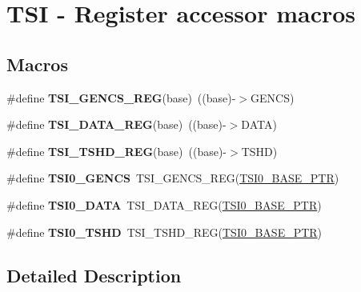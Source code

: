 \hypertarget{group___t_s_i___register___accessor___macros}{}\section{T\+SI -\/ Register accessor macros}
\label{group___t_s_i___register___accessor___macros}
\subsection*{Macros}
\begin{DoxyCompactItemize}
\item 
\mbox{\label{group___t_s_i___register___accessor___macros_ga71c97f61d42d8b0ec0b77a23ca06b9f1}} 
\#define {\bfseries T\+S\+I\+\_\+\+G\+E\+N\+C\+S\+\_\+\+R\+EG}(base)~((base)-\/$>$G\+E\+N\+CS)
\item 
\mbox{\label{group___t_s_i___register___accessor___macros_gaff76941d6e8fe865f4526e5a183e0d53}} 
\#define {\bfseries T\+S\+I\+\_\+\+D\+A\+T\+A\+\_\+\+R\+EG}(base)~((base)-\/$>$D\+A\+TA)
\item 
\mbox{\label{group___t_s_i___register___accessor___macros_gac1d48eafdd0182d91ea6578926c038e9}} 
\#define {\bfseries T\+S\+I\+\_\+\+T\+S\+H\+D\+\_\+\+R\+EG}(base)~((base)-\/$>$T\+S\+HD)
\item 
\mbox{\label{group___t_s_i___register___accessor___macros_gabe033284ba64fa3097ff12d10c0b5e85}} 
\#define {\bfseries T\+S\+I0\+\_\+\+G\+E\+N\+CS}~T\+S\+I\+\_\+\+G\+E\+N\+C\+S\+\_\+\+R\+EG(\hyperlink{group___t_s_i___peripheral_gaf98ea1cd15559446e0cfc1ae177751f6}{T\+S\+I0\+\_\+\+B\+A\+S\+E\+\_\+\+P\+TR})
\item 
\mbox{\label{group___t_s_i___register___accessor___macros_gac08465d7c2f98c2c372c26e622a05126}} 
\#define {\bfseries T\+S\+I0\+\_\+\+D\+A\+TA}~T\+S\+I\+\_\+\+D\+A\+T\+A\+\_\+\+R\+EG(\hyperlink{group___t_s_i___peripheral_gaf98ea1cd15559446e0cfc1ae177751f6}{T\+S\+I0\+\_\+\+B\+A\+S\+E\+\_\+\+P\+TR})
\item 
\mbox{\label{group___t_s_i___register___accessor___macros_ga8a7a92091c84eb3bddf218fa540d611f}} 
\#define {\bfseries T\+S\+I0\+\_\+\+T\+S\+HD}~T\+S\+I\+\_\+\+T\+S\+H\+D\+\_\+\+R\+EG(\hyperlink{group___t_s_i___peripheral_gaf98ea1cd15559446e0cfc1ae177751f6}{T\+S\+I0\+\_\+\+B\+A\+S\+E\+\_\+\+P\+TR})
\end{DoxyCompactItemize}


\subsection{Detailed Description}

